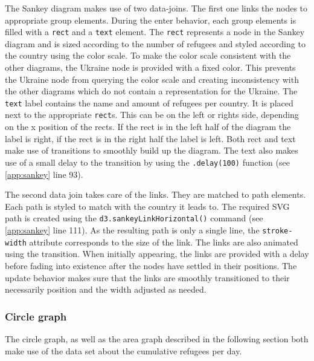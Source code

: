 The Sankey diagram makes use of two data-joins. The first one links the nodes to appropriate group elements. During the enter behavior, each group elements is filled with a \texttt{rect} and a \texttt{text} element. The \texttt{rect} represents a node in the Sankey diagram and is sized according to the number of refugees and styled according to the country using the color scale. To make the color scale consistent with the other diagrams, the Ukraine node is provided with a fixed color. This prevents the Ukraine node from querying the color scale and creating inconsistency with the other diagrams which do not contain a representation for the Ukraine. The \texttt{text} label contains the name and amount of refugees per country. It is placed next to the appropriate \texttt{rect}s. This can be on the left or rights side, depending on the x position of the rects. If the rect is in the left half of the diagram the label is right, if the rect is in the right half the label is left. Both rect and text make use of transitions to smoothly build up the diagram. The text also makes use of a small delay to the transition by using the \texttt{.delay(100)} function (see \ref{app:sankey} line 93).

The second data join takes care of the links. They are matched to path elements. Each path is styled to match with the country it leads to. The required SVG path is created using the \texttt{d3.sankeyLinkHorizontal()} command (see \ref{app:sankey} line 111). As the resulting path is only a single line, the \texttt{stroke-width} attribute corresponds to the size of the link. The links are also animated using the transition. When initially appearing, the links are provided with a delay before fading into existence after the nodes have settled in their positions. The update behavior makes sure that the links are smoothly transitioned to their necessarily position and the width adjusted as needed.

\subsubsection{Circle graph}
The circle graph, as well as the area graph described in the following section both make use of the data set about the cumulative refugees per day.

